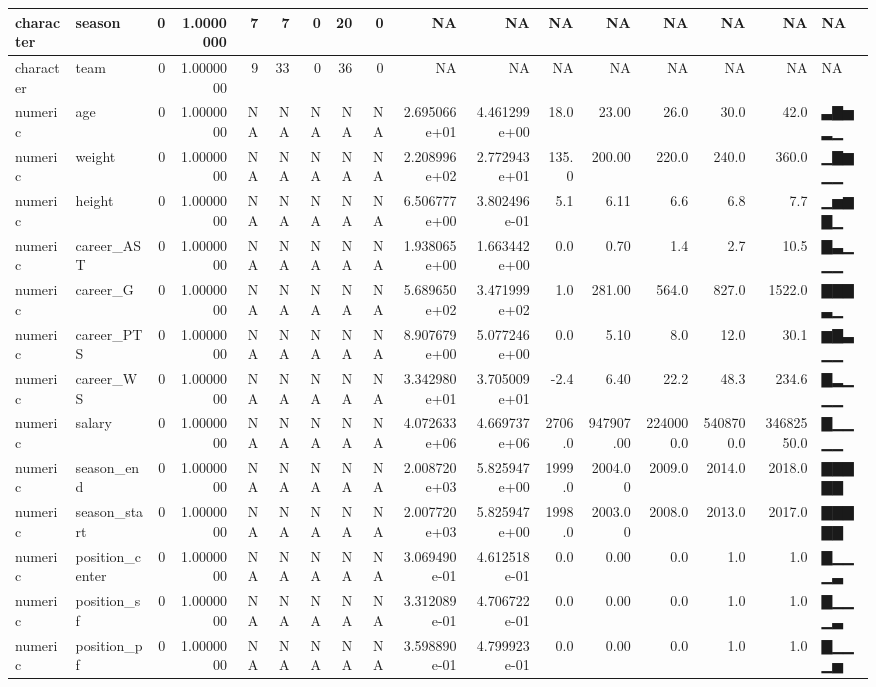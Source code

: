 \documentclass[
]{book}
\begin{document}
\begin{tabular}{l|l|r|r|r|r|r|r|r|r|r|r|r|r|r|r|l}
\hline
character & season & 0 & 1.0000000 & 7 & 7 & 0 & 20 & 0 & NA & NA & NA & NA & NA & NA & NA & NA\\
\hline
character & team & 0 & 1.0000000 & 9 & 33 & 0 & 36 & 0 & NA & NA & NA & NA & NA & NA & NA & NA\\
\hline
numeric & age & 0 & 1.0000000 & NA & NA & NA & NA & NA & 2.695066e+01 & 4.461299e+00 & 18.0 & 23.00 & 26.0 & 30.0 & 42.0 & ▃▇▅▂▁\\
\hline
numeric & weight & 0 & 1.0000000 & NA & NA & NA & NA & NA & 2.208996e+02 & 2.772943e+01 & 135.0 & 200.00 & 220.0 & 240.0 & 360.0 & ▁▇▆▁▁\\
\hline
numeric & height & 0 & 1.0000000 & NA & NA & NA & NA & NA & 6.506777e+00 & 3.802496e-01 & 5.1 & 6.11 & 6.6 & 6.8 & 7.7 & ▁▅▆▇▁\\
\hline
numeric & career\_AST & 0 & 1.0000000 & NA & NA & NA & NA & NA & 1.938065e+00 & 1.663442e+00 & 0.0 & 0.70 & 1.4 & 2.7 & 10.5 & ▇▃▁▁▁\\
\hline
numeric & career\_G & 0 & 1.0000000 & NA & NA & NA & NA & NA & 5.689650e+02 & 3.471999e+02 & 1.0 & 281.00 & 564.0 & 827.0 & 1522.0 & ▇▇▇▃▁\\
\hline
numeric & career\_PTS & 0 & 1.0000000 & NA & NA & NA & NA & NA & 8.907679e+00 & 5.077246e+00 & 0.0 & 5.10 & 8.0 & 12.0 & 30.1 & ▆▇▃▁▁\\
\hline
numeric & career\_WS & 0 & 1.0000000 & NA & NA & NA & NA & NA & 3.342980e+01 & 3.705009e+01 & -2.4 & 6.40 & 22.2 & 48.3 & 234.6 & ▇▂▁▁▁\\
\hline
numeric & salary & 0 & 1.0000000 & NA & NA & NA & NA & NA & 4.072633e+06 & 4.669737e+06 & 2706.0 & 947907.00 & 2240000.0 & 5408700.0 & 34682550.0 & ▇▁▁▁▁\\
\hline
numeric & season\_end & 0 & 1.0000000 & NA & NA & NA & NA & NA & 2.008720e+03 & 5.825947e+00 & 1999.0 & 2004.00 & 2009.0 & 2014.0 & 2018.0 & ▇▇▇▇▇\\
\hline
numeric & season\_start & 0 & 1.0000000 & NA & NA & NA & NA & NA & 2.007720e+03 & 5.825947e+00 & 1998.0 & 2003.00 & 2008.0 & 2013.0 & 2017.0 & ▇▇▇▇▇\\
\hline
numeric & position\_center & 0 & 1.0000000 & NA & NA & NA & NA & NA & 3.069490e-01 & 4.612518e-01 & 0.0 & 0.00 & 0.0 & 1.0 & 1.0 & ▇▁▁▁▃\\
\hline
numeric & position\_sf & 0 & 1.0000000 & NA & NA & NA & NA & NA & 3.312089e-01 & 4.706722e-01 & 0.0 & 0.00 & 0.0 & 1.0 & 1.0 & ▇▁▁▁▃\\
\hline
numeric & position\_pf & 0 & 1.0000000 & NA & NA & NA & NA & NA & 3.598890e-01 & 4.799923e-01 & 0.0 & 0.00 & 0.0 & 1.0 & 1.0 & ▇▁▁▁▅\\

\end{tabular}
\end{document}
